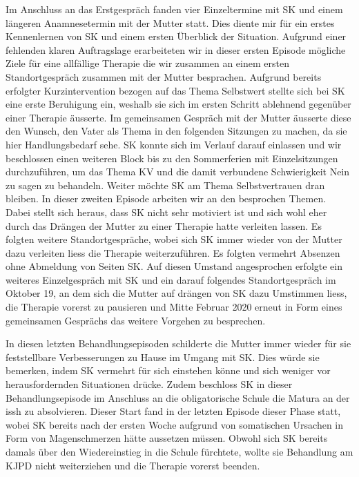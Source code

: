 Im Anschluss an das Erstgespräch fanden vier Einzeltermine mit SK und einem längeren Anamnesetermin mit der Mutter statt. Dies diente mir für ein erstes Kennenlernen von SK und einem ersten Überblick der Situation. Aufgrund einer fehlenden klaren Auftragslage erarbeiteten wir in dieser ersten Episode mögliche Ziele für eine allfällige Therapie die wir zusammen an einem ersten Standortgespräch zusammen mit der Mutter besprachen. Aufgrund bereits erfolgter Kurzintervention bezogen auf das Thema Selbstwert stellte sich bei SK eine erste Beruhigung ein, weshalb sie sich im ersten Schritt ablehnend gegenüber einer Therapie äusserte. Im gemeinsamen Gespräch mit der Mutter äusserte diese den Wunsch, den Vater als Thema in den folgenden Sitzungen zu machen, da sie hier Handlungsbedarf sehe. SK konnte sich im Verlauf darauf einlassen und wir beschlossen einen weiteren Block bis zu den Sommerferien mit Einzelsitzungen durchzuführen, um das Thema KV und die damit verbundene Schwierigkeit Nein zu sagen zu behandeln. Weiter möchte SK am Thema Selbstvertrauen dran bleiben. In dieser zweiten Episode arbeiten wir an den besprochen Themen. Dabei stellt sich heraus, dass SK nicht sehr motiviert ist und sich wohl eher durch das Drängen der Mutter zu einer Therapie hatte verleiten lassen. Es folgten weitere Standortgespräche, wobei sich SK immer wieder von der Mutter dazu verleiten liess die Therapie weiterzuführen. Es folgten vermehrt Absenzen ohne Abmeldung von Seiten SK. Auf diesen Umstand angesprochen erfolgte ein weiteres Einzelgespräch mit SK und ein darauf folgendes Standortgespräch im Oktober 19, an dem sich die Mutter auf drängen von SK dazu Umstimmen liess, die Therapie vorerst zu pausieren und Mitte Februar 2020 erneut in Form eines gemeinsamen Gesprächs das weitere Vorgehen zu besprechen.

In diesen letzten Behandlungsepisoden schilderte die Mutter immer wieder für sie feststellbare Verbesserungen zu Hause im Umgang mit SK. Dies würde sie bemerken, indem SK vermehrt für sich einstehen könne und sich weniger vor herausfordernden Situationen drücke. Zudem beschloss SK in dieser Behandlungsepisode im Anschluss an die obligatorische Schule die Matura an der \ac{issh} zu absolvieren. Dieser Start fand in der letzten Episode dieser Phase statt, wobei SK bereits nach der ersten Woche aufgrund von somatischen Ursachen in Form von Magenschmerzen hätte aussetzen müssen. Obwohl sich SK bereits damals über den Wiedereinstieg in die Schule fürchtete, wollte sie Behandlung am KJPD nicht weiterziehen und die Therapie vorerst beenden. 
 
